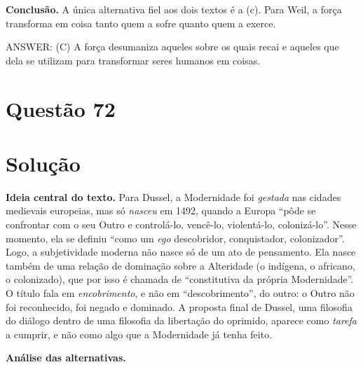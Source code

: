 \documentclass{article}%
\begin{document}
\textbf{Conclusão.} A única alternativa fiel aos dois textos é a (c). Para Weil, a força transforma em coisa tanto quem a sofre quanto quem a exerce.

ANSWER: (C) A força desumaniza aqueles sobre os quais recai e aqueles que dela se utilizam para transformar seres humanos em coisas.%
\newpage%
\section*{Questão 72}

\section*{Solução}

\textbf{Ideia central do texto.} Para Dussel, a Modernidade foi \emph{gestada} nas cidades medievais europeias, mas só \emph{nasceu} em 1492, quando a Europa ``pôde se confrontar com o seu Outro e controlá-lo, vencê-lo, violentá-lo, colonizá-lo''. Nesse momento, ela se definiu ``como um \emph{ego} descobridor, conquistador, colonizador''. Logo, a subjetividade moderna não nasce só de um ato de pensamento. Ela nasce também de uma relação de dominação sobre a Alteridade (o indígena, o africano, o colonizado), que por isso é chamada de ``constitutiva da própria Modernidade''. O título fala em \emph{encobrimento}, e não em ``descobrimento'', do outro: o Outro não foi reconhecido, foi negado e dominado. A proposta final de Dussel, uma filosofia do diálogo dentro de uma filosofia da libertação do oprimido, aparece como \emph{tarefa} a cumprir, e não como algo que a Modernidade já tenha feito.

\textbf{Análise das alternativas.}
\end{document}
